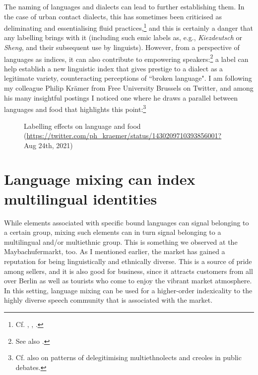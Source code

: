 The naming of languages and dialects can lead to further establishing them. In the case of urban contact dialects, this has sometimes been criticised as deliminating and essentialising fluid practices,\footnote{Cf. \citet{Jaspers2008}, \citet{Androutsopoulos2011}, \citet{CornipsEtAl2015}.} and this is certainly a danger that any labelling brings with it (including such emic labels as, e.g., \textit{Kiez\-deutsch} or \textit{Sheng}, and their subsequent use by linguists). However, from a perspective of languages as indices, it can also contribute to empowering speakers:\footnote{See also \citet{Wiese2015}.} a label can help establish a new linguistic index that gives prestige to a dialect as a legitimate variety, counteracting perceptions of “broken language". I am following my colleague Philip Krämer from Free University Brussels on Twitter, and among his many insightful postings I noticed one where he draws a parallel between languages and food that highlights this point:\footnote{Cf. also \citet{Krämer2017} on patterns of delegitimising multiethnolects and creoles in public debates.}


\begin{figure}
\caption{\label{fig:15} Labelling effects on language and food (\url{https://twitter.com/ph_kraemer/status/1430209710393856001?} Aug 24th, 2021)}
\end{figure}

\section{Language mixing can index multilingual identities}
\hypertarget{Toc125444665}{}
While elements associated with specific bound languages can signal belonging to a certain group, mixing such elements can in turn signal belonging to a multilingual and/or multiethnic group. This is something we observed at the Maybachufermarkt, too. As I mentioned earlier, the market has gained a reputation for being linguistically and ethnically diverse. This is a source of pride among sellers, and it is also good for business, since it attracts customers from all over Berlin as well as tourists who come to enjoy the vibrant market atmosphere. In this setting, language mixing can be used for a higher-order indexicality to the highly diverse speech community that is associated with the market.


